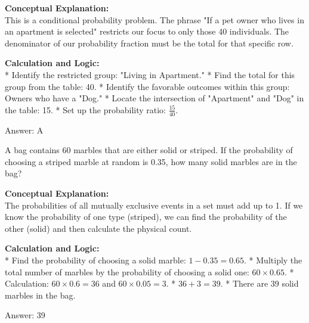 \documentclass[11pt,paper=a4,answers]{exam}
\begin{document}
\begin{questions}
\begin{solution}
\textbf{Conceptual Explanation:} \\
This is a conditional probability problem. The phrase "If a pet owner who lives in an apartment is selected" restricts our focus to only those 40 individuals. The denominator of our probability fraction must be the total for that specific row.

\vspace{30pt}

\textbf{Calculation and Logic:} \\
* Identify the restricted group: "Living in Apartment."
* Find the total for this group from the table: 40.
* Identify the favorable outcomes within this group: Owners who have a "Dog."
* Locate the intersection of "Apartment" and "Dog" in the table: 15.
* Set up the probability ratio: $\frac{15}{40}$.

\vspace{30pt}

Answer: \colorbox{yellow!100}{A}
\end{solution}

\vspace{60pt}

\question
A bag contains 60 marbles that are either solid or striped. If the probability of choosing a striped marble at random is 0.35, how many solid marbles are in the bag?

\begin{solution}
\textbf{Conceptual Explanation:} \\
The probabilities of all mutually exclusive events in a set must add up to 1. If we know the probability of one type (striped), we can find the probability of the other (solid) and then calculate the physical count.

\vspace{30pt}

\textbf{Calculation and Logic:} \\
* Find the probability of choosing a solid marble: $1 - 0.35 = 0.65$.
* Multiply the total number of marbles by the probability of choosing a solid one: $60 \times 0.65$.
* Calculation: $60 \times 0.6 = 36$ and $60 \times 0.05 = 3$. 
* $36 + 3 = 39$.
* There are 39 solid marbles in the bag.

\vspace{30pt}

Answer: \colorbox{yellow!100}{39}
\end{solution}


\end{questions}
\end{document}
